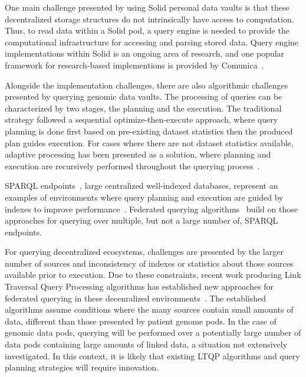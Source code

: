 \documentclass[a4paper,11pt]{article}
\begin{document}
\begin{refsection}
One main challenge presented by using Solid personal data vaults is that these decentralized storage structures do not intrinsically have access to computation. 
Thus, to read data within a Solid pod, a query engine is needed to provide the computational infrastructure for accessing and parsing stored data.
Query engine implementations within Solid is an ongoing area of research, and one popular framework for research-based implementions is provided by Comunica~\cite{comunica}.


Alongside the implementation challenges, there are also algorithmic challenges presented by querying genomic data vaults.
The processing of queries can be characterized by two stages, the planning and the execution. 
The traditional strategy followed a sequential optimize-then-execute approach, where query planning is done first based on pre-existing dataset statistics then the produced plan guides execution. 
For cases where there are not dataset statistics available, adaptive processing has been presented as a solution, where planning and execution are recursively performed throughout the querying process~\cite{adaptive_book}.

SPARQL endpoints~\cite{spec:sparqlprot}, large centralized well-indexed databases, represent an examples of environments where query planning and execution are guided by indexes to improve performance~\cite{sparqlqueryoptimization}.
Federated querying algorithms~\cite{hibiscus,tpf} build on those approaches for querying over multiple, but not a large number of, SPARQL endpoints.

For querying decentralized ecosystems, challenges are presented by the larger number of sources and inconsistency of indexes or statistics about those sources available prior to execution.
Due to these constraints, recent work producing Link Traversal Query Processing algorithms has established new approaches for federated querying in these decenralized environments~\cite{taelman_LTQP_2023}.
The established algorithms assume conditions where the many sources contain small amounts of data, different than those presented by patient genome pods.
In the case of genomic data pods, querying will be performed over a potentially large number of data pods containing large amounts of linked data, a situation not extensively investigated. 
In this context, it is likely that existing LTQP algorithms and query planning strategies will require innovation. 



\end{refsection}
\end{document}
